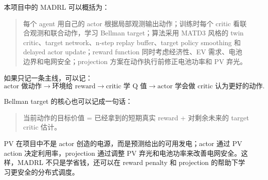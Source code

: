 \documentclass[UTF8,zihao=-4]{ctexart}
\begin{document}
本项目中的 MADRL 可以概括为：
\begin{quote}
每个 agent 用自己的 actor 根据局部观测输出动作；训练时每个 critic 看联合观测和联合动作，学习 Bellman target；算法采用 MATD3 风格的 twin critic、target network、n-step replay buffer、target policy smoothing 和 delayed actor update；reward function 同时考虑经济性、EV 需求、电池边界和电网安全；projection 方案在动作执行前修正电池功率和 PV 弃光。
\end{quote}

如果只记一条主线，可以记：
\begin{equation}
\text{actor 做动作}
\rightarrow
\text{环境给 reward}
\rightarrow
\text{critic 学 Q 值}
\rightarrow
\text{actor 学会做 critic 认为更好的动作}.
\end{equation}

Bellman target 的核心也可以记成一句话：
\begin{quote}
当前动作的目标价值 = 已经拿到的短期真实 reward + 对剩余未来的 target critic 估计。
\end{quote}

PV 在项目中不是 actor 创造的电源，而是预测给出的可用发电；actor 通过 PV action 决定利用率，projection 通过调整 PV 弃光和电池功率来改善电网安全。这样，MADRL 不只是学省钱，还可以在 reward penalty 和 projection 的帮助下学习更安全的分布式调度。
\end{document}
